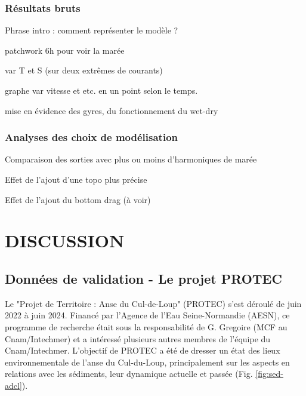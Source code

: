 \documentclass[10pt,a4paper,titlepage]{article}
\begin{document}
\subsubsection{Résultats bruts}
Phrase intro : comment représenter le modèle ?

patchwork 6h pour voir la marée

var T et S (sur deux extrêmes de courants)

graphe var vitesse et etc. en un point selon le temps.

mise en évidence des gyres, du fonctionnement du wet-dry

\subsubsection{Analyses des choix de modélisation}
Comparaison des sorties avec plus ou moins d'harmoniques de marée

Effet de l'ajout d'une topo plus précise

Effet de l'ajout du bottom drag (à voir)

\newpage

\section{DISCUSSION}
\label{sec:discussion}



\subsection{Données de validation - Le projet PROTEC}
\label{subsub:protec}

Le "Projet de Territoire : Anse du Cul-de-Loup" (PROTEC) s'est déroulé de juin 2022 à juin 2024. Financé par l'Agence de l'Eau Seine-Normandie (AESN), ce programme de recherche était sous la responsabilité de G. Gregoire (MCF au Cnam/Intechmer) et a intéressé plusieurs autres membres de l'équipe du Cnam/Intechmer. L'objectif de PROTEC a été de dresser un état des lieux environnementale de l'anse du Cul-du-Loup, principalement sur les aspects en relations avec les sédiments, leur dynamique actuelle et passée (Fig. \ref{fig:sed-adcl}).
\end{document}
